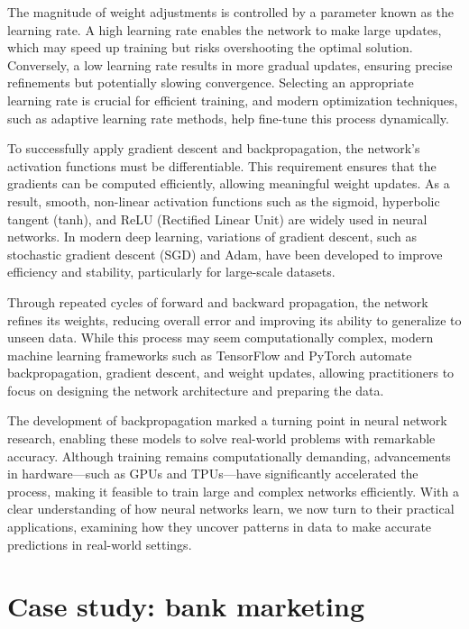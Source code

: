 \documentclass[
]{book}
\theoremstyle{definition}
\theoremstyle{definition}
\theoremstyle{definition}
\theoremstyle{definition}
\theoremstyle{remark}
\begin{document}
The magnitude of weight adjustments is controlled by a parameter known as the learning rate. A high learning rate enables the network to make large updates, which may speed up training but risks overshooting the optimal solution. Conversely, a low learning rate results in more gradual updates, ensuring precise refinements but potentially slowing convergence. Selecting an appropriate learning rate is crucial for efficient training, and modern optimization techniques, such as adaptive learning rate methods, help fine-tune this process dynamically.

To successfully apply gradient descent and backpropagation, the network's activation functions must be differentiable. This requirement ensures that the gradients can be computed efficiently, allowing meaningful weight updates. As a result, smooth, non-linear activation functions such as the sigmoid, hyperbolic tangent (tanh), and ReLU (Rectified Linear Unit) are widely used in neural networks. In modern deep learning, variations of gradient descent, such as stochastic gradient descent (SGD) and Adam, have been developed to improve efficiency and stability, particularly for large-scale datasets.

Through repeated cycles of forward and backward propagation, the network refines its weights, reducing overall error and improving its ability to generalize to unseen data. While this process may seem computationally complex, modern machine learning frameworks such as TensorFlow and PyTorch automate backpropagation, gradient descent, and weight updates, allowing practitioners to focus on designing the network architecture and preparing the data.

The development of backpropagation marked a turning point in neural network research, enabling these models to solve real-world problems with remarkable accuracy. Although training remains computationally demanding, advancements in hardware---such as GPUs and TPUs---have significantly accelerated the process, making it feasible to train large and complex networks efficiently. With a clear understanding of how neural networks learn, we now turn to their practical applications, examining how they uncover patterns in data to make accurate predictions in real-world settings.

\section{Case study: bank marketing}\label{case-study-bank-marketing}
\end{document}
